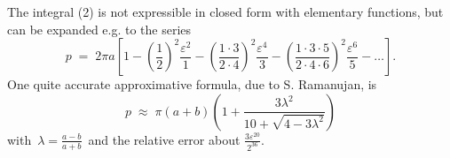 \documentclass[12pt]{article}
\begin{document}
The integral (2) is not expressible in closed form with elementary functions, but can be expanded e.g. to the series 
$$p \;=\; 2\pi a\left[1-\left(\frac{1}{2}\right)^2\frac{\varepsilon^2}{1}
-\left(\frac{1\cdot3}{2\cdot4}\right)^2\frac{\varepsilon^4}{3}
-\left(\frac{1\cdot3\cdot5}{2\cdot4\cdot6}\right)^2\frac{\varepsilon^6}{5}-\ldots\right]\!.$$
One quite accurate approximative formula, due to S. Ramanujan, is 
$$p \;\approx\; \pi(a\!+\!b)\left(1+\frac{3\lambda^2}{10+\sqrt{4-3\lambda^2}}\right)$$
with\, $\displaystyle\lambda = \frac{a\!-\!b}{a\!+\!b}$\, and the relative error about $\displaystyle\frac{3\varepsilon^{20}}{2^{36}}$.
\end{document}

